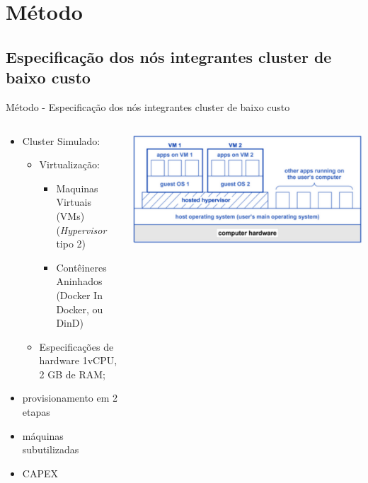 \documentclass[10pt,brazil]{beamer}
\theoremstyle{definition}
\begin{document}
\section{Método}

\subsection{Especificação dos nós integrantes cluster de baixo custo}

\begin{frame}{Método - Especificação dos nós integrantes cluster de baixo custo}
  \begin{columns}
    \begin{column}{0.5\textwidth}
      \begin{itemize}
        \item Cluster Simulado:
              \begin{itemize}
                \item Virtualização:
                      \begin{itemize}
                        \item Maquinas Virtuais (VMs) (\emph{Hypervisor} tipo 2)
                        \item Contêineres Aninhados (Docker In Docker, ou DinD)
                      \end{itemize}
                \item Especificações de hardware 1vCPU, 2 GB de RAM;
              \end{itemize}
        \item provisionamento em 2 etapas
        \item máquinas subutilizadas
        \item CAPEX
              
      \end{itemize}
    \end{column}
    \begin{column}{0.5\textwidth}  %
      \begin{center}
        \includegraphics[width=1\textwidth]{vms.png}
      \end{center}
    \end{column}
  \end{columns}
\end{frame}
\end{document}
